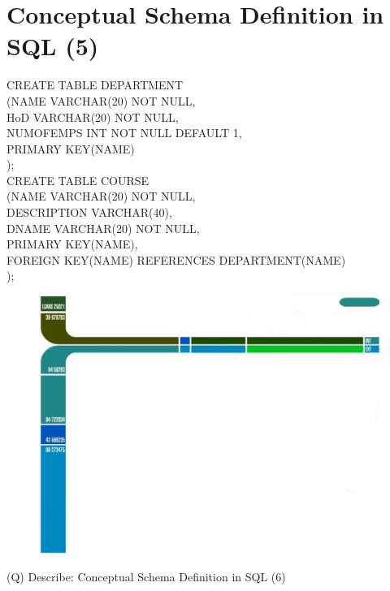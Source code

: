 \documentclass[12pt]{article}
\begin{document}
\section{Conceptual Schema Definition in SQL (5)}
CREATE TABLE DEPARTMENT\\
(NAME VARCHAR(20) NOT NULL,\\
HoD VARCHAR(20) NOT NULL,\\
NUMOFEMPS INT NOT NULL DEFAULT 1,\\
PRIMARY KEY(NAME)\\
);\\
CREATE TABLE COURSE\\
(NAME VARCHAR(20) NOT NULL,\\
DESCRIPTION VARCHAR(40),\\
DNAME VARCHAR(20) NOT NULL,\\
PRIMARY KEY(NAME),\\
FOREIGN KEY(NAME) REFERENCES DEPARTMENT(NAME)\\
);\\
\begin{figure}[H]
\includegraphics[width=0.5\linewidth]{page9-image-1.png}
\end{figure}
\clearpage
(Q)
Describe: Conceptual Schema Definition in SQL (6)
\\ 
 \\
\end{document}
